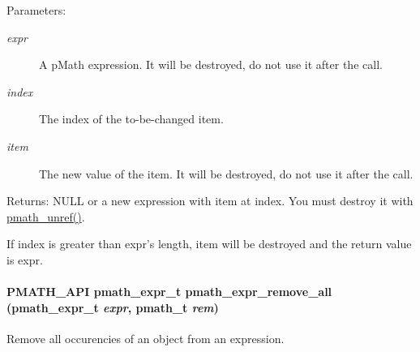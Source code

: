 \begin{Desc}
\item[Parameters:]
\begin{description}
\item[{\em expr}]A pMath expression. It will be destroyed, do not use it after the call. \item[{\em index}]The index of the to-be-changed item. \item[{\em item}]The new value of the item. It will be destroyed, do not use it after the call. \end{description}
\end{Desc}
\begin{Desc}
\item[Returns:]NULL or a new expression with item at index. You must destroy it with \hyperlink{classpmath__t_54e905402c38940687033b87eb8c6c9f}{pmath\_\-unref()}.\end{Desc}
If index is greater than expr's length, item will be destroyed and the return value is expr. \hypertarget{group__expressions_g639d7a67fe8b892667b00acc2504b474}{
\paragraph[{pmath\_\-expr\_\-remove\_\-all}]{\setlength{\rightskip}{0pt plus 5cm}PMATH\_\-API {\bf pmath\_\-expr\_\-t} pmath\_\-expr\_\-remove\_\-all ({\bf pmath\_\-expr\_\-t} {\em expr}, \/  {\bf pmath\_\-t} {\em rem})}\hfill}
\label{group__expressions_g639d7a67fe8b892667b00acc2504b474}


Remove all occurencies of an object from an expression. 

